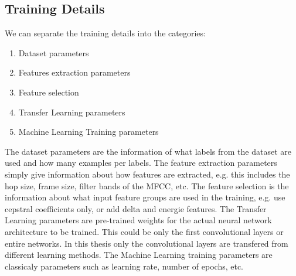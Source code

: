 
\subsection{Training Details}
We can separate the training details into the categories:
\begin{enumerate}
  \item Dataset parameters
  \item Features extraction parameters
  \item Feature selection
  \item Transfer Learning parameters
  \item Machine Learning Training parameters
\end{enumerate}
The dataset parameters are the information of what labels from the dataset are used and how many examples per labels.
The feature extraction parameters simply give information about how features are extracted, e.g. this includes the hop size, frame size, filter bands of the MFCC, etc.
The feature selection is the information about what input feature groups are used in the training, e.g. use cepstral coefficients only, or add delta and energie features.
The Transfer Learning parameters are pre-trained weights for the actual neural network architecture to be trained. 
This could be only the first convolutional layers or entire networks. 
In this thesis only the convolutional layers are transfered from different learning methods.
The Machine Learning training parameters are classicaly parameters such as learning rate, number of epochs, etc.

